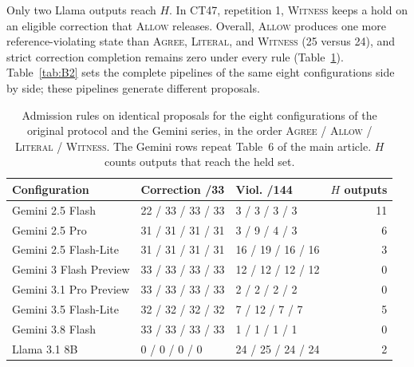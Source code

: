 \documentclass[acmsmall,review]{acmart}
\newcommand{\agree}{\textsc{Agree}}
\newcommand{\allow}{\textsc{Allow}}
\newcommand{\literal}{\textsc{Literal}}
\newcommand{\witness}{\textsc{Witness}}
\begin{document}
Only two Llama outputs reach $H$. In CT47, repetition 1, \witness{} keeps a hold on an eligible correction that \allow{} releases. Overall, \allow{} produces one more reference-violating state than \agree{}, \literal{}, and \witness{} (25 versus 24), and strict correction completion remains zero under every rule (Table~\ref{tab:B1}). Table~\ref{tab:B2} sets the complete pipelines of the same eight configurations side by side; these pipelines generate different proposals.

\begin{table}[H]
\centering
\caption{Admission rules on identical proposals for the eight configurations of the original protocol and the Gemini series, in the order \agree{} / \allow{} / \literal{} / \witness{}. The Gemini rows repeat Table~6 of the main article. $H$ counts outputs that reach the held set.}\label{tab:B1}
\small
\setlength{\tabcolsep}{4pt}
\begin{tabular}{@{}lllr@{}}
\toprule
\textbf{Configuration} & \textbf{Correction /33} & \textbf{Viol. /144} & \textbf{$H$ outputs} \\
\midrule
Gemini 2.5 Flash & 22 / 33 / 33 / 33 & 3 / 3 / 3 / 3 & 11 \\
Gemini 2.5 Pro & 31 / 31 / 31 / 31 & 3 / 9 / 4 / 3 & 6 \\
Gemini 2.5 Flash-Lite & 31 / 31 / 31 / 31 & 16 / 19 / 16 / 16 & 3 \\
Gemini 3 Flash Preview & 33 / 33 / 33 / 33 & 12 / 12 / 12 / 12 & 0 \\
Gemini 3.1 Pro Preview & 33 / 33 / 33 / 33 & 2 / 2 / 2 / 2 & 0 \\
Gemini 3.5 Flash-Lite & 32 / 32 / 32 / 32 & 7 / 12 / 7 / 7 & 5 \\
Gemini 3.8 Flash & 33 / 33 / 33 / 33 & 1 / 1 / 1 / 1 & 0 \\
Llama 3.1 8B & 0 / 0 / 0 / 0 & 24 / 25 / 24 / 24 & 2 \\
\bottomrule
\end{tabular}
\end{table}
\end{document}
